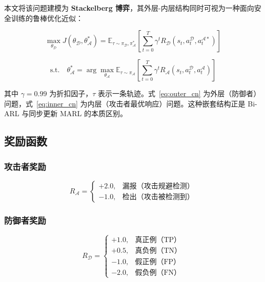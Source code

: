 \documentclass[12pt,a4paper]{ctexart}
\begin{document}
本文将该问题建模为 \textbf{Stackelberg 博弈}，其外层-内层结构同时可视为一种面向安全训练的鲁棒优化近似\cite{ben2009robust}：

\begin{equation}
\max_{\theta_{\mathcal{D}}} J(\theta_{\mathcal{D}}, \theta_{\mathcal{A}}^*) =
\mathbb{E}_{\tau \sim \pi_{\mathcal{D}}, \pi_{\mathcal{A}}^*}
\left[\sum_{t=0}^{T} \gamma^t R_{\mathcal{D}}(s_t, a_t^{\mathcal{D}}, a_t^{\mathcal{A}*})\right]
\label{eq:outer_cn}
\end{equation}

\begin{equation}
\text{s.t.} \quad
\theta_{\mathcal{A}}^* =
\arg\max_{\theta_{\mathcal{A}}}
\mathbb{E}_{\tau \sim \pi_{\mathcal{A}}}
\left[\sum_{t=0}^{T} \gamma^t R_{\mathcal{A}}(s_t, a_t^{\mathcal{D}}, a_t^{\mathcal{A}})\right]
\label{eq:inner_cn}
\end{equation}

其中 $\gamma = 0.99$ 为折扣因子，$\tau$ 表示一条轨迹。式~\eqref{eq:outer_cn} 为外层（防御者）问题，式~\eqref{eq:inner_cn} 为内层（攻击者最优响应）问题。这种嵌套结构正是 Bi-ARL 与同步更新 MARL 的本质区别。

\subsection{奖励函数}

\subsubsection{攻击者奖励}

\begin{equation}
R_{\mathcal{A}}=
\begin{cases}
+2.0, & \text{漏报（攻击规避检测）}\\
-1.0, & \text{检出（攻击被检测到）}
\end{cases}
\end{equation}

\subsubsection{防御者奖励}

\begin{equation}
R_{\mathcal{D}}=
\begin{cases}
+1.0, & \text{真正例（TP）}\\
+0.5, & \text{真负例（TN）}\\
-1.0, & \text{假正例（FP）}\\
-2.0, & \text{假负例（FN）}
\end{cases}
\end{equation}
\end{document}
